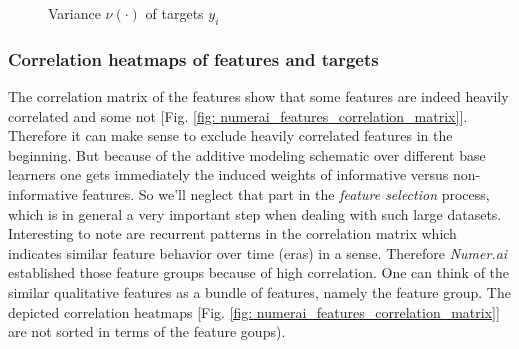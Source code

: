 \documentclass[12pt, a4paper]{article}
\begin{document}
\begin{figure}[htbp]
\begin{minipage}[t]{8.5cm}
\caption[Variance of Features]{Variance $\nu(\cdot)$ of targets $y_i$ }
\label{fig: targets_variance}
\end{minipage}
\end{figure}
\newpage
\subsubsection{Correlation heatmaps of features and targets}
The correlation matrix of the features show that some features are indeed heavily correlated and some not [Fig. \ref{fig: numerai_features_correlation_matrix}]. Therefore it can make sense to exclude heavily correlated features in the beginning. But because of the additive modeling schematic over different base learners one gets immediately the induced weights of informative versus non-informative features. So we'll neglect that part in the \textit{feature selection} process, which is in general a very important step when dealing with such large datasets.
Interesting to note are recurrent patterns in the correlation matrix which indicates similar feature behavior over time (eras) in a sense. Therefore \textit{Numer.ai} established those feature groups because of high correlation. One can think of the similar qualitative features as a bundle of features, namely the feature group. The depicted correlation heatmaps [Fig. \ref{fig: numerai_features_correlation_matrix}] are not sorted in terms of the feature goups).
\end{document}
